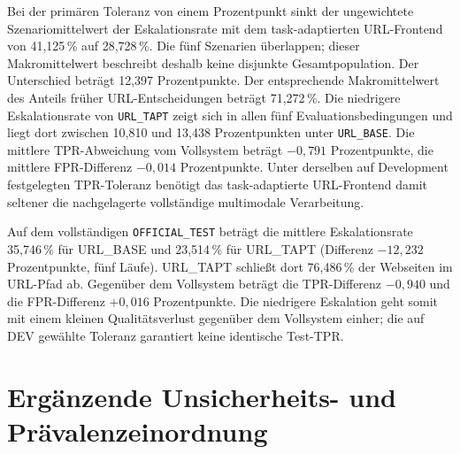 Bei der primären Toleranz von einem Prozentpunkt sinkt der ungewichtete
Szenariomittelwert der Eskalationsrate mit dem task-adaptierten URL-Frontend
von 41,125\,\% auf 28,728\,\%. Die fünf Szenarien überlappen; dieser Makromittelwert
beschreibt deshalb keine disjunkte Gesamtpopulation. Der Unterschied beträgt
12,397 Prozentpunkte. Der entsprechende Makromittelwert des Anteils früher URL-Entscheidungen beträgt
71,272\,\%. Die niedrigere Eskalationsrate von \nolinkurl{URL_TAPT} zeigt sich
in allen fünf Evaluationsbedingungen und liegt dort zwischen 10,810 und 13,438 Prozentpunkten
unter \nolinkurl{URL_BASE}. Die mittlere TPR-Abweichung vom Vollsystem beträgt
$-0{,}791$ Prozentpunkte, die mittlere FPR-Differenz $-0{,}014$ Prozentpunkte. Unter
derselben auf Development festgelegten TPR-Toleranz benötigt das task-adaptierte
URL-Frontend damit seltener die nachgelagerte vollständige multimodale Verarbeitung.

Auf dem vollständigen \nolinkurl{OFFICIAL_TEST} beträgt die mittlere Eskalationsrate
35,746\,\% für URL\_BASE und 23,514\,\% für URL\_TAPT
(Differenz $-12{,}232$ Prozentpunkte, fünf Läufe). URL\_TAPT schließt dort
76,486\,\% der Webseiten im URL-Pfad ab. Gegenüber dem Vollsystem beträgt die
TPR-Differenz $-0{,}940$ und die FPR-Differenz $+0{,}016$ Prozentpunkte.
Die niedrigere Eskalation geht somit mit einem kleinen Qualitätsverlust gegenüber
dem Vollsystem einher; die auf DEV gewählte Toleranz garantiert keine identische Test-TPR.

\section{Ergänzende Unsicherheits- und Prävalenzeinordnung}

